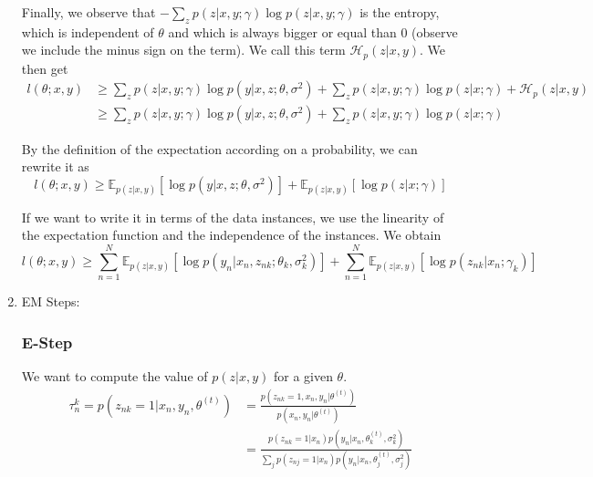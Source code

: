 \documentclass{article}
\begin{document}
\begin{enumerate}
Finally, we observe that $-\sum_{z}p(z|x,y;\gamma)\log{p(z|x,y;\gamma)}$ is the entropy, which is independent of $\theta$ and which is always bigger or equal than $0$ (observe we include the minus sign on the term). We call this term $\mathcal{H}_p(z|x,y)$. We then get
\begin{equation*}
\begin{split}
l(\theta;x,y) &\ge \sum_{z}p(z|x,y;\gamma)\log p(y|x,z;\theta,\sigma^2) + \sum_{z}p(z|x,y;\gamma)\log p(z|x;\gamma) + \mathcal{H}_p(z|x,y)\\
&\ge \sum_{z}p(z|x,y;\gamma)\log p(y|x,z;\theta,\sigma^2) + \sum_{z}p(z|x,y;\gamma)\log p(z|x;\gamma)
\end{split}
\end{equation*}

By the definition of the expectation according on a probability, we can rewrite it as
\begin{equation*}
l(\theta;x,y) \ge \mathbb{E}_{p(z|x,y)}\left[\log p(y|x,z;\theta,\sigma^2)\right] + \mathbb{E}_{p(z|x,y)}\left[\log p(z|x;\gamma)\right]
\end{equation*}

If we want to write it in terms of the data instances, we use the linearity of the expectation function and the independence of the instances. We obtain
\begin{equation*}
l(\theta;x,y) \ge \sum_{n=1}^N\mathbb{E}_{p(z|x,y)}\left[\log p(y_n|x_n,z_{nk};\theta_k,\sigma_k^2)\right] + \sum_{n=1}^N\mathbb{E}_{p(z|x,y)}\left[\log p(z_{nk}|x_n;\gamma_k)\right]
\end{equation*}



\item EM Steps:

\subsubsection*{E-Step}
We want to compute the value of $p(z|x,y)$ for a given $\theta$.
\begin{equation*}
\begin{split}
\tau_n^k = p(z_{nk}=1|x_n,y_n,\theta^{(t)}) &= \frac{p(z_{nk}=1,x_n,y_n|\theta^{(t)})}{p(x_n,y_n|\theta^{(t)})}\\
&=\frac{p(z_{nk}=1|x_n)p(y_n|x_n,\theta_k^{(t)},\sigma_k^2)}{\sum_j p(z_{nj}=1|x_n)p(y_n|x_n,\theta_j^{(t)},\sigma_j^2)}
\end{split}
\end{equation*}


\end{enumerate}
\end{document}
